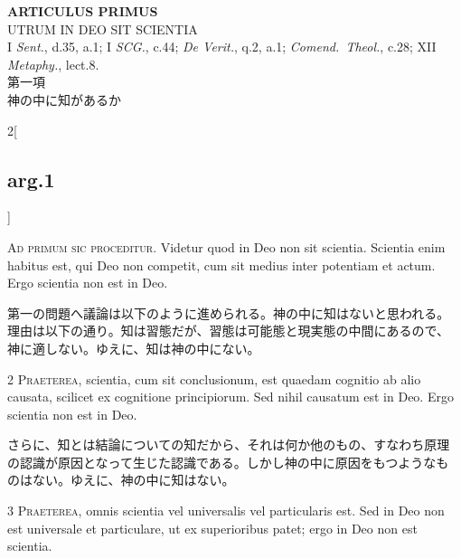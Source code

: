 \documentclass[paper=a4paper,fontsize=10pt,jafontsize=9pt,titlepage]{jlreq}
\begin{document}
\newpage
{}
{}
\setcounter{section}{1}
\setcounter{subsection}{0}
\begin{center}
{\Large {\bfseries ARTICULUS PRIMUS}}\\
{\large UTRUM IN DEO SIT SCIENTIA}\\
{\footnotesize I {\itshape Sent.}, d.35, a.1; I {\itshape SCG.}, c.44; {\itshape De Verit.}, q.2, a.1; {\itshape Comend.~Theol.}, c.28; XII {\itshape Metaphy.}, lect.8.}\\
{\Large 第一項\\神の中に知があるか}
\end{center}



\begin{paracol}{2}[\subsection{arg.1}]

{\huge A}{\scshape d primum sic proceditur}.  Videtur quod in Deo non sit
scientia. Scientia enim habitus est, qui Deo non competit, cum sit
medius inter potentiam et actum. Ergo scientia non est in Deo.

\switchcolumn

第一の問題へ議論は以下のように進められる。神の中に知はないと思われる。
理由は以下の通り。知は習態だが、習態は可能態と現実態の中間にあるので、
神に適しない。ゆえに、知は神の中にない。


{\scshape 2 Praeterea}, scientia, cum sit conclusionum, est quaedam
cognitio ab alio causata, scilicet ex cognitione principiorum. Sed
nihil causatum est in Deo. Ergo scientia non est in Deo.

\switchcolumn

さらに、知とは結論についての知だから、それは何か他のもの、すなわち原理
の認識が原因となって生じた認識である。しかし神の中に原因をもつようなも
のはない。ゆえに、神の中に知はない。


{\scshape 3 Praeterea}, omnis scientia vel universalis vel
particularis est. Sed in Deo non est universale et particulare, ut ex
superioribus patet; ergo in Deo non est scientia.


\end{paracol}
\end{document}
